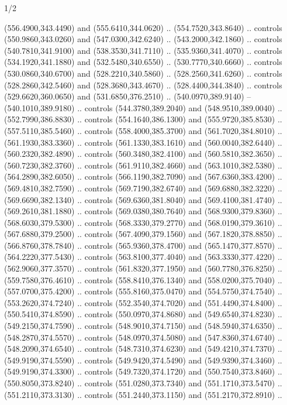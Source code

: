 \begin{flagdescription}{1/2}
\begin{scope}[xshift=0.5\flaglength,yshift=0.5\flagwidth,scale=\flagwidth/759]
\begin{scope}[y=0.8pt, x=0.8pt, yscale=-1,shift={(-720,-480)}]
\begin{scope}[cm={{1.14637,0.0,0.0,1.17117,(33.17849,82.1384)}}]
  (556.4900,343.4490) and (555.6410,344.0620) .. (554.7520,343.8640) .. controls
  (550.9860,343.0260) and (547.0300,342.6240) .. (543.2000,342.1860) .. controls
  (540.7810,341.9100) and (538.3530,341.7110) .. (535.9360,341.4070) .. controls
  (534.1920,341.1880) and (532.5480,340.6550) .. (530.7770,340.6660) .. controls
  (530.0860,340.6700) and (528.2210,340.5860) .. (528.2560,341.6260) .. controls
  (528.2860,342.5460) and (528.3680,343.4670) .. (528.4400,344.3840) .. controls
  (529.6620,360.0650) and (531.6850,376.2510) .. (540.0970,389.9140) --
  (540.1010,389.9180) .. controls (544.3780,389.2040) and (548.9510,389.0040) ..
  (552.7990,386.8830) .. controls (554.1640,386.1300) and (555.9720,385.8530) ..
  (557.5110,385.5460) .. controls (558.4000,385.3700) and (561.7020,384.8010) ..
  (561.1930,383.3360) .. controls (561.1330,383.1610) and (560.0040,382.6440) ..
  (560.2320,382.4890) .. controls (560.3480,382.4100) and (560.5810,382.3650) ..
  (560.7230,382.3760) .. controls (561.9110,382.4660) and (563.1010,382.5380) ..
  (564.2890,382.6050) .. controls (566.1190,382.7090) and (567.6360,383.4200) ..
  (569.4810,382.7590) .. controls (569.7190,382.6740) and (569.6880,382.3220) ..
  (569.6690,382.1340) .. controls (569.6360,381.8040) and (569.4100,381.4740) ..
  (569.2610,381.1880) .. controls (569.0380,380.7640) and (568.9300,379.8360) ..
  (568.6030,379.5300) .. controls (568.3330,379.2770) and (568.0190,379.3610) ..
  (567.6880,379.2500) .. controls (567.4090,379.1560) and (567.1820,378.8850) ..
  (566.8760,378.7840) .. controls (565.9360,378.4700) and (565.1470,377.8570) ..
  (564.2220,377.5430) .. controls (563.8100,377.4040) and (563.3330,377.4220) ..
  (562.9060,377.3570) .. controls (561.8320,377.1950) and (560.7780,376.8250) ..
  (559.7580,376.4610) .. controls (558.8410,376.1340) and (558.0200,375.7040) ..
  (557.0700,375.4200) .. controls (555.8160,375.0470) and (554.5750,374.7540) ..
  (553.2620,374.7240) .. controls (552.3540,374.7020) and (551.4490,374.8400) ..
  (550.5410,374.8590) .. controls (550.0970,374.8680) and (549.6540,374.8230) ..
  (549.2150,374.7590) .. controls (548.9010,374.7150) and (548.5940,374.6350) ..
  (548.2870,374.5570) .. controls (548.0970,374.5080) and (547.8360,374.6740) ..
  (548.2090,374.6540) .. controls (548.7310,374.6230) and (549.4210,374.7370) ..
  (549.9190,374.5590) .. controls (549.9420,374.5490) and (549.9390,374.3460) ..
  (549.9190,374.3300) .. controls (549.7320,374.1720) and (550.7540,373.8460) ..
  (550.8050,373.8240) .. controls (551.0280,373.7340) and (551.1710,373.5470) ..
  (551.2110,373.3130) .. controls (551.2440,373.1150) and (551.2170,372.8910) ..

\end{scope}
\end{scope}
\end{scope}
\end{flagdescription}

